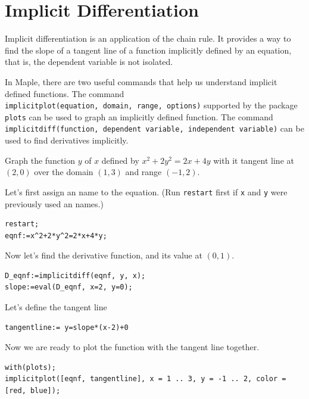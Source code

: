\documentclass[]{book}
\theoremstyle{definition}
\theoremstyle{definition}
\theoremstyle{definition}
\theoremstyle{remark}
\let\BeginKnitrBlock\begin \let\EndKnitrBlock\end
\begin{document}
\hypertarget{implicit-differentiation}{%
\section{Implicit Differentiation}\label{implicit-differentiation}}

Implicit differentiation is an application of the chain rule. It provides a way to find the slope of a tangent line of a function implicitly defined by an equation, that is, the dependent variable is not isolated.

In Maple, there are two useful commands that help us understand implicit defined functions.
The command \texttt{implicitplot(equation,\ domain,\ range,\ options)} supported by the package \texttt{plots} can be used to graph an implicitly defined function.
The command \texttt{implicitdiff(function,\ dependent\ variable,\ independent\ variable)} can be used to find derivatives implicitly.

\BeginKnitrBlock{example}
\protect\hypertarget{exm:unnamed-chunk-22}{}{\label{exm:unnamed-chunk-22} }
Graph the function \(y\) of \(x\) defined by \(x^2+2y^2=2x+4y\) with it tangent line at \((2, 0)\) over the domain \((1, 3)\) and range \((-1, 2)\).
\EndKnitrBlock{example}

\BeginKnitrBlock{solution}
{}
Let's first assign an name to the equation. (Run \texttt{restart} first if \texttt{x} and \texttt{y} were previously used an names.)

\begin{verbatim}
restart;
eqnf:=x^2+2*y^2=2*x+4*y;
\end{verbatim}

Now let's find the derivative function, and its value at \((0, 1)\).

\begin{verbatim}
D_eqnf:=implicitdiff(eqnf, y, x);
slope:=eval(D_eqnf, x=2, y=0);
\end{verbatim}

Let's define the tangent line

\begin{verbatim}
tangentline:= y=slope*(x-2)+0
\end{verbatim}

Now we are ready to plot the function with the tangent line together.

\begin{verbatim}
with(plots);
implicitplot([eqnf, tangentline], x = 1 .. 3, y = -1 .. 2, color = [red, blue]);
\end{verbatim}
\EndKnitrBlock{solution}
\end{document}
